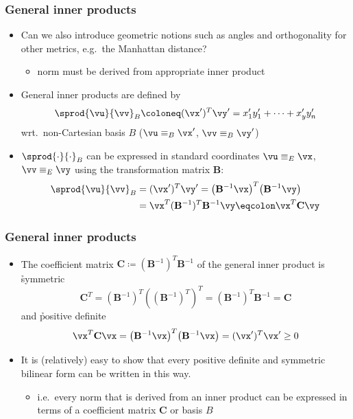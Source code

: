 \begin{frame}
  \frametitle{General inner products} 
  
  \begin{itemize}
  \item Can we also introduce geometric notions such as angles and orthogonality
    for other metrics, e.g.\ the Manhattan distance?
    \begin{itemize}
    \item[\hand] norm must be derived from appropriate inner product
    \end{itemize}
    \pause\gap
  \item General \h{inner products} are defined by
    \[ 
    \sprod{\vu}{\vv}_B \coloneq (\vx')^T \vy' = x'_1 y'_1 + \dots + x'_ y y'_n 
    \] 
    wrt.\ non-Cartesian basis $B$ ($\vu \equiv_B \vx'$, $\vv \equiv_B \vy'$)%
    \pause\gap
  \item $\sprod{\cdot}{\cdot}_B$ can be expressed in standard coordinates
    $\vu\equiv_E \vx$, $\vv \equiv_E \vy$ using the transformation matrix
    $\mathbf{B}$:
    \begin{align*}
      \sprod{\vu}{\vv}_B &= (\vx')^T \vy' 
      = \bigl( \mathbf{B}^{-1} \vx \bigr)^T \bigl( \mathbf{B}^{-1} \vy \bigr) \\
      &= \vx^T (\mathbf{B}^{-1})^T \mathbf{B}^{-1} \vy \eqcolon \vx^T \mathbf{C} \vy
    \end{align*}
  \end{itemize}
\end{frame}

\begin{frame}
  \frametitle{General inner products} 
  
  \begin{itemize}
  \item The coefficient matrix $\mathbf{C} \coloneq (\mathbf{B}^{-1})^T
    \mathbf{B}^{-1}$ of the general inner product is \h{symmetric}
    \[
    \mathbf{C}^T = (\mathbf{B}^{-1})^T ((\mathbf{B}^{-1})^T)^T =
    (\mathbf{B}^{-1})^T \mathbf{B}^{-1} = \mathbf{C}
    \]
    \pause
    and \h{positive definite}
    \[
    \vx^T \mathbf{C} \vx 
    = \bigl( \mathbf{B}^{-1} \vx \bigr)^T \bigl( \mathbf{B}^{-1} \vx \bigr)
    = (\vx')^T \vx' \geq 0
    \]
    \pause
  \item It is (relatively) easy to show that every positive definite and
    symmetric bilinear form can be written in this way.
    \begin{itemize}
    \item[\hand] i.e.\ every norm that is derived from an inner product can be
      expressed in terms of a coefficient matrix $\mathbf{C}$ or basis $B$
    \end{itemize}
  \end{itemize}
\end{frame}

